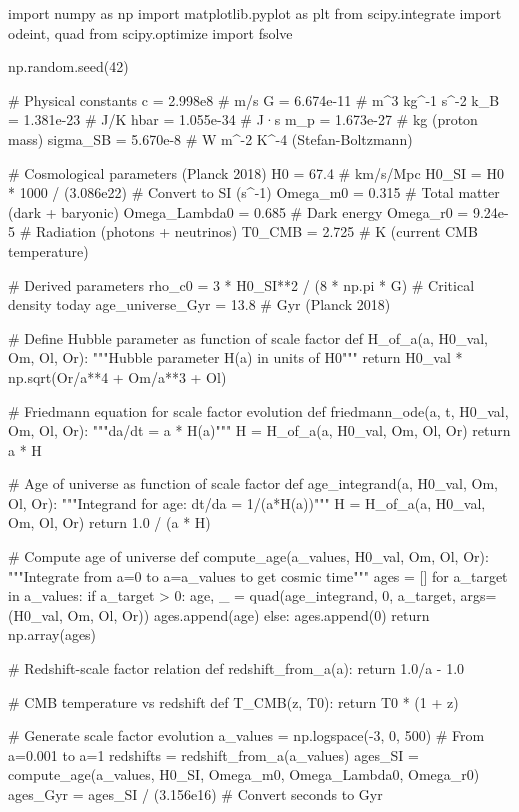 \documentclass[a4paper, 11pt]{article}
\begin{document}
\begin{pycode}
import numpy as np
import matplotlib.pyplot as plt
from scipy.integrate import odeint, quad
from scipy.optimize import fsolve

np.random.seed(42)

# Physical constants
c = 2.998e8  # m/s
G = 6.674e-11  # m^3 kg^-1 s^-2
k_B = 1.381e-23  # J/K
hbar = 1.055e-34  # J·s
m_p = 1.673e-27  # kg (proton mass)
sigma_SB = 5.670e-8  # W m^-2 K^-4 (Stefan-Boltzmann)

# Cosmological parameters (Planck 2018)
H0 = 67.4  # km/s/Mpc
H0_SI = H0 * 1000 / (3.086e22)  # Convert to SI (s^-1)
Omega_m0 = 0.315  # Total matter (dark + baryonic)
Omega_Lambda0 = 0.685  # Dark energy
Omega_r0 = 9.24e-5  # Radiation (photons + neutrinos)
T0_CMB = 2.725  # K (current CMB temperature)

# Derived parameters
rho_c0 = 3 * H0_SI**2 / (8 * np.pi * G)  # Critical density today
age_universe_Gyr = 13.8  # Gyr (Planck 2018)

# Define Hubble parameter as function of scale factor
def H_of_a(a, H0_val, Om, Ol, Or):
    """Hubble parameter H(a) in units of H0"""
    return H0_val * np.sqrt(Or/a**4 + Om/a**3 + Ol)

# Friedmann equation for scale factor evolution
def friedmann_ode(a, t, H0_val, Om, Ol, Or):
    """da/dt = a * H(a)"""
    H = H_of_a(a, H0_val, Om, Ol, Or)
    return a * H

# Age of universe as function of scale factor
def age_integrand(a, H0_val, Om, Ol, Or):
    """Integrand for age: dt/da = 1/(a*H(a))"""
    H = H_of_a(a, H0_val, Om, Ol, Or)
    return 1.0 / (a * H)

# Compute age of universe
def compute_age(a_values, H0_val, Om, Ol, Or):
    """Integrate from a=0 to a=a_values to get cosmic time"""
    ages = []
    for a_target in a_values:
        if a_target > 0:
            age, _ = quad(age_integrand, 0, a_target, args=(H0_val, Om, Ol, Or))
            ages.append(age)
        else:
            ages.append(0)
    return np.array(ages)

# Redshift-scale factor relation
def redshift_from_a(a):
    return 1.0/a - 1.0

# CMB temperature vs redshift
def T_CMB(z, T0):
    return T0 * (1 + z)

# Generate scale factor evolution
a_values = np.logspace(-3, 0, 500)  # From a=0.001 to a=1
redshifts = redshift_from_a(a_values)
ages_SI = compute_age(a_values, H0_SI, Omega_m0, Omega_Lambda0, Omega_r0)
ages_Gyr = ages_SI / (3.156e16)  # Convert seconds to Gyr


\end{pycode}
\end{document}
